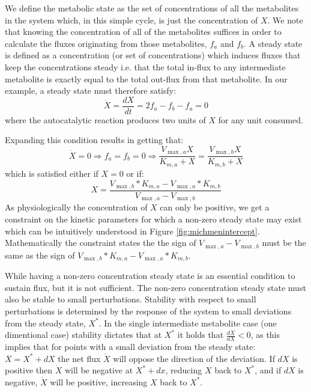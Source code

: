 \documentclass[a4page,notitlepage]{article}
\begin{document}
    We define the metabolic state as the set of concentrations of all the metabolites in the system which, in this simple cycle, is just the concentration of $X$.
    We note that knowing the concentration of all of the metabolites suffices in order to calculate the fluxes originating from those metabolites, $f_a$ and $f_b$.
    A steady state is defined as a concentration (or set of concentrations) which induces fluxes that keep the concentrations steady i.e. that the total in-flux to any intermediate metabolite is exactly equal to the total out-flux from that metabolite.
    In our example, a steady state must therefore satisfy:
    \begin{equation*}
      \dot X = \frac{dX}{dt} = 2f_a - f_b - f_a = 0
    \end{equation*}
    where the autocatalytic reaction produces two units of $X$ for any unit consumed.

    Expanding this condition results in getting that:
    \begin{equation*}
      \dot X = 0 \Rightarrow f_a = f_b = 0 \Rightarrow \frac{V_{\max,a}X}{K_{m,a}+X}=\frac{V_{\max,b}X}{K_{m,b}+X}
    \end{equation*}
    which is satisfied either if $X=0$ or if:
    \begin{equation*}
      X=\frac{V_{\max,b}*K_{m,a}-V_{\max,a}*K_{m,b}}{V_{\max,a}-V_{\max,b}}
    \end{equation*}
    As physiologically the concentration of $X$ can only be positive, we get a constraint on the kinetic parameters for which a non-zero steady state may exist which can be intuitively understood in Figure \ref{fig:michmenintercept}.
    Mathematically the constraint states the the sign of $V_{\max,a}-V_{\max,b}$ must be the same as the sign of $V_{\max,b}*K_{m,a}-V_{\max,a}*K_{m,b}$.

    While having a non-zero concentration steady state is an essential condition to sustain flux, but it is not sufficient.
    The non-zero concentration steady state must also be stable to small perturbations.
    Stability with respect to small perturbations is determined by the response of the system to small deviations from the steady state, $X^*$.
    In the single intermediate metabolite case (one dimentional case) stability dictates that at $X^*$ it holds that $\frac{d\dot X}{dX} <0$, as this  implies that for points with a small deviation from the steady state: $X = X^*+dX$ the net flux $\dot X$ will oppose the direction of the deviation.
    If $dX$ is positive then $\dot X$ will be negative at $X^*+dx$, reducing $X$ back to $X^*$, and if $dX$ is negative, $\dot X$ will be positive, increasing $X$ back to $X^*$.
\end{document}
